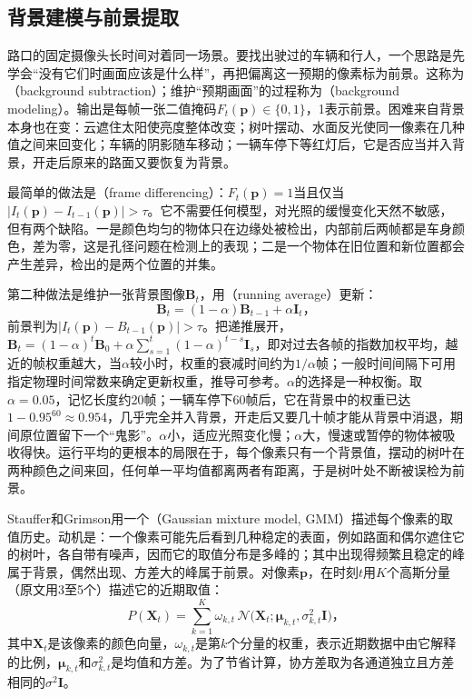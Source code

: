 \subsection{背景建模与前景提取}
\label{sec:vision-videofound-background}

路口的固定摄像头长时间对着同一场景。要找出驶过的车辆和行人，一个思路是先学会“没有它们时画面应该是什么样”，再把偏离这一预期的像素标为前景。这称为（background subtraction）；维护“预期画面”的过程称为（background modeling）。输出是每帧一张二值掩码$F_t(\bm p)\in\{0,1\}$，1表示前景。困难来自背景本身也在变：云遮住太阳使亮度整体改变；树叶摆动、水面反光使同一像素在几种值之间来回变化；车辆的阴影随车移动；一辆车停下等红灯后，它是否应当并入背景，开走后原来的路面又要恢复为背景。

最简单的做法是（frame differencing）：$F_t(\bm p)=1$当且仅当$|I_t(\bm p)-I_{t-1}(\bm p)|>\tau$。它不需要任何模型，对光照的缓慢变化天然不敏感，但有两个缺陷。一是颜色均匀的物体只在边缘处被检出，内部前后两帧都是车身颜色，差为零，这是孔径问题在检测上的表现；二是一个物体在旧位置和新位置都会产生差异，检出的是两个位置的并集。

第二种做法是维护一张背景图像$\bm B_t$，用（running average）更新：
\begin{equation}
  \bm B_t=(1-\alpha)\bm B_{t-1}+\alpha\bm I_t\text{，}
  \label{eq:vision-videofound-running-average}
\end{equation}
前景判为$|I_t(\bm p)-B_{t-1}(\bm p)|>\tau$。把递推展开，$\bm B_t=(1-\alpha)^t\bm B_0+\alpha\sum_{s=1}^{t}(1-\alpha)^{t-s}\bm I_s$，即对过去各帧的指数加权平均，越近的帧权重越大，当$\alpha$较小时，权重的衰减时间约为$1/\alpha$帧；一般时间间隔下可用指定物理时间常数来确定更新权重，推导可参考。$\alpha$的选择是一种权衡。取$\alpha=0.05$，记忆长度约20帧；一辆车停下60帧后，它在背景中的权重已达$1-0.95^{60}\approx0.954$，几乎完全并入背景，开走后又要几十帧才能从背景中消退，期间原位置留下一个“鬼影”。$\alpha$小，适应光照变化慢；$\alpha$大，慢速或暂停的物体被吸收得快。运行平均的更根本的局限在于，每个像素只有一个背景值，摆动的树叶在两种颜色之间来回，任何单一平均值都离两者有距离，于是树叶处不断被误检为前景。

Stauffer和Grimson用一个（Gaussian mixture model, GMM）描述每个像素的取值历史。动机是：一个像素可能先后看到几种稳定的表面，例如路面和偶尔遮住它的树叶，各自带有噪声，因而它的取值分布是多峰的；其中出现得频繁且稳定的峰属于背景，偶然出现、方差大的峰属于前景。对像素$\bm p$，在时刻$t$用$K$个高斯分量（原文用3至5个）描述它的近期取值：
\begin{equation}
  P(\bm X_t)=\sum_{k=1}^{K}\omega_{k,t}\,
  \mathcal N\bigl(\bm X_t;\bm\mu_{k,t},\sigma_{k,t}^2\bm I\bigr)\text{，}
  \label{eq:vision-videofound-gmm}
\end{equation}
其中$\bm X_t$是该像素的颜色向量，$\omega_{k,t}$是第$k$个分量的权重，表示近期数据中由它解释的比例，$\bm\mu_{k,t}$和$\sigma_{k,t}^2$是均值和方差。为了节省计算，协方差取为各通道独立且方差相同的$\sigma^2\bm I$。

